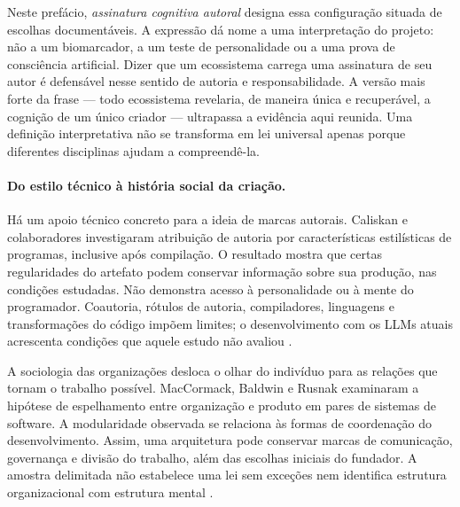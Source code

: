 Neste prefácio, \emph{assinatura cognitiva autoral} designa essa configuração
situada de escolhas documentáveis. A expressão dá nome a uma interpretação
do projeto: não a um biomarcador, a um teste de personalidade ou a uma prova
de consciência artificial. Dizer que um ecossistema carrega uma assinatura de
seu autor é defensável nesse sentido de autoria e responsabilidade. A versão
mais forte da frase --- todo ecossistema revelaria, de maneira única e
recuperável, a cognição de um único criador --- ultrapassa a evidência aqui
reunida. Uma definição interpretativa não se transforma em lei universal
apenas porque diferentes disciplinas ajudam a compreendê-la.

\paragraph{Do estilo técnico à história social da criação.}
Há um apoio técnico concreto para a ideia de marcas autorais. Caliskan e
colaboradores investigaram atribuição de autoria por características
estilísticas de programas, inclusive após compilação. O resultado mostra que
certas regularidades do artefato podem conservar informação sobre sua
produção, nas condições estudadas. Não demonstra acesso à personalidade ou à
mente do programador. Coautoria, rótulos de autoria, compiladores, linguagens e
transformações do código impõem limites; o desenvolvimento com os LLMs atuais
acrescenta condições que aquele estudo não avaliou
.

A sociologia das organizações desloca o olhar do indivíduo para as relações
que tornam o trabalho possível. MacCormack, Baldwin e Rusnak examinaram a
hipótese de espelhamento entre organização e produto em pares de sistemas de
software. A modularidade observada se relaciona às formas de coordenação do
desenvolvimento. Assim, uma arquitetura pode conservar marcas de comunicação,
governança e divisão do trabalho, além das escolhas iniciais do fundador.
A amostra delimitada não estabelece uma lei sem exceções nem identifica
estrutura organizacional com estrutura mental
.

